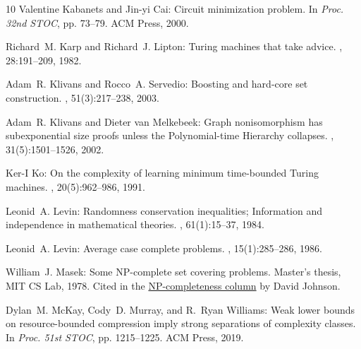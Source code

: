 \documentclass[11pt]{article}
\numberwithin{equation}{section}
\theoremstyle{definition}
\theoremstyle{plain}
\begin{document}
\begin{thebibliography}{10}
{\sc Valentine Kabanets and Jin{-}yi Cai}: Circuit minimization problem.
\newblock In {\em Proc. 32nd STOC}, pp. 73--79. ACM Press, 2000.
\newblock [\epfmtdoi{10.1145/335305.335314}]

{\sc Richard~M. Karp and Richard~J. Lipton}: Turing machines that take advice.
, 28:191--209, 1982.

{\sc Adam~R. Klivans and Rocco~A. Servedio}: Boosting and hard-core set
  construction.
, 51(3):217--238, 2003.
\newblock [\epfmtdoi{10.1023/A:1022949332276}]

{\sc Adam~R. Klivans and Dieter van Melkebeek}: Graph nonisomorphism has
  subexponential size proofs unless the {P}olynomial-time {H}ierarchy
  collapses.
, 31(5):1501--1526, 2002.
\newblock [\epfmtdoi{10.1137/S0097539700389652}]

{\sc Ker{-}I Ko}: On the complexity of learning minimum time-bounded {T}uring
  machines.
, 20(5):962--986, 1991.
\newblock [\epfmtdoi{10.1137/0220059}]

{\sc Leonid~A. Levin}: Randomness conservation inequalities; {I}nformation and
  independence in mathematical theories.
, 61(1):15--37, 1984.
\newblock [\epfmtdoi{10.1016/S0019-9958(84)80060-1}]

{\sc Leonid~A. Levin}: Average case complete problems.
, 15(1):285--286, 1986.
\newblock [\epfmtdoi{10.1137/0215020}]

{\sc William~J. Masek}: Some {NP}-complete set covering problems.
\newblock Master's thesis, MIT CS Lab, 1978.
\newblock Cited in the
  \href{https://www.sciencedirect.com/science/article/pii/0196677487900216}{NP-completeness
  column} by David Johnson.

{\sc Dylan~M. McKay, Cody~D. Murray, and R.~Ryan Williams}: Weak lower bounds
  on resource-bounded compression imply strong separations of complexity
  classes.
\newblock In {\em Proc. 51st STOC}, pp. 1215--1225. ACM Press, 2019.
\newblock [\epfmtdoi{10.1145/3313276.3316396}]


\end{thebibliography}
\end{document}
